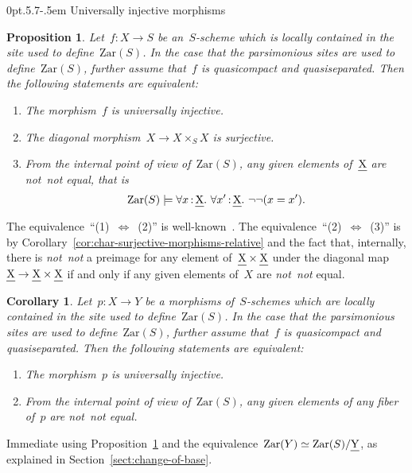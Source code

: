 \documentclass[10pt,reqno,a4paper]{amsbook}
\makeatletter
\theoremstyle{definition}
\theoremstyle{plain}
\newtheorem{prop}[defn]{Proposition}
\newtheorem{cor}[defn]{Corollary}
\theoremstyle{remark}
\let\oldul\ul
\renewcommand{\ul}[1]{\text{\oldul{$#1$}}}
\newcommand{\Zar}{\mathrm{Zar}}
\newcommand{\?}{\,{:}\,}
\renewcommand{\_}{\mathpunct{.}\,}
\newcommand{\notnot}{\emph{not~not}\xspace}
\newcommand{\stacksproject}[1]{\cite[{\href{http://stacks.math.columbia.edu/tag/#1}{Tag~#1}}]{stacks-project}}
\renewenvironment{proof}[1][\proofname]{\par
  \pushQED{\qed}%
  \normalfont \topsep6\p@\@plus6\p@\relax
  \trivlist
  \item[\hskip\labelsep
        \itshape
    #1\@addpunct{.}]\ignorespaces
}{%
  \popQED\endtrivlist\@endpefalse
}
\def\subsection{\@startsection{subsection}{2}%
  {0pt}{.5\linespacing\@plus.7\linespacing}{-.5em}%
  {\normalfont\bfseries}}
\makeatother
\begin{document}
\subsection{Universally injective morphisms}

\begin{prop}\label{prop:char-univ-injective-morphisms}
Let~$f : X \to S$ be an~$S$-scheme which is locally contained in the site
used to define~$\Zar(S)$. In the case that the parsimonious sites are used to
define~$\Zar(S)$, further assume that~$f$ is quasicompact and quasiseparated.
Then the following statements are equivalent:
\begin{enumerate}
\item The morphism~$f$ is universally injective.
\item The diagonal morphism~$X \to X \times_S X$ is surjective.
\item From the internal point of view of~$\Zar(S)$, any given elements of~$\ul{X}$
are \notnot equal, that is
\[ \Zar(S) \models \forall x\?\ul{X}\_ \forall x'\?\ul{X}\_ \neg\neg(x = x'). \]
\end{enumerate}
\end{prop}

\begin{proof}The equivalence~``(1)~$\Leftrightarrow$~(2)'' is
well-known~\stacksproject{01S4}. The equivalence~``(2)~$\Leftrightarrow$~(3)''
is by Corollary~\ref{cor:char-surjective-morphisms-relative} and the fact that,
internally, there is \notnot a preimage for any element of~$\ul{X} \times
\ul{X}$ under the diagonal map~$\ul{X} \to \ul{X} \times \ul{X}$ if and only if
any given elements of~$X$ are \notnot equal.
\end{proof}

\begin{cor}Let~$p : X \to Y$ be a morphisms of~$S$-schemes which are locally
contained in the site used to define~$\Zar(S)$. In the case that the
parsimonious sites are used to define~$\Zar(S)$, further assume that~$f$ is
quasicompact and quasiseparated. Then the following statements
are equivalent:
\begin{enumerate}
\item The morphism~$p$ is universally injective.
\item From the internal point of view of~$\Zar(S)$, any given elements of any
fiber of~$p$ are \notnot equal.
\end{enumerate}
\end{cor}

\begin{proof}Immediate using Proposition~\ref{prop:char-univ-injective-morphisms}
and the equivalence~$\Zar(Y) \simeq \Zar(S)/\ul{Y}$,
as explained in Section~\ref{sect:change-of-base}.
\end{proof}
\end{document}

